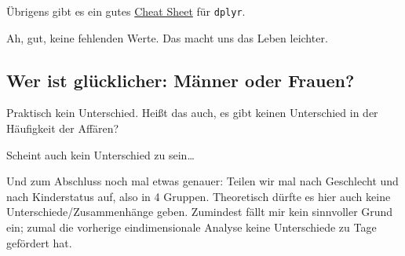 \documentclass[12pt,ngerman,]{book}
\newenvironment{Shaded}{\begin{snugshade}}{\end{snugshade}}
\newcommand{\KeywordTok}[1]{\textcolor[rgb]{0.13,0.29,0.53}{\textbf{{#1}}}}
\newcommand{\DataTypeTok}[1]{\textcolor[rgb]{0.13,0.29,0.53}{{#1}}}
\newcommand{\StringTok}[1]{\textcolor[rgb]{0.31,0.60,0.02}{{#1}}}
\newcommand{\CommentTok}[1]{\textcolor[rgb]{0.56,0.35,0.01}{\textit{{#1}}}}
\newcommand{\NormalTok}[1]{{#1}}
\renewenvironment{Shaded}{\begin{kframe}}{\end{kframe}}
\begin{document}
Übrigens gibt es ein gutes
\href{https://www.rstudio.com/wp-content/uploads/2015/02/data-wrangling-cheatsheet.pdf}{Cheat
Sheet} für \texttt{dplyr}.

Ah, gut, keine fehlenden Werte. Das macht uns das Leben leichter.

\subsection{Wer ist glücklicher: Männer oder
Frauen?}\label{wer-ist-glucklicher-manner-oder-frauen}

\begin{Shaded}
\end{Shaded}

Praktisch kein Unterschied. Heißt das auch, es gibt keinen Unterschied
in der Häufigkeit der Affären?

\begin{Shaded}
\end{Shaded}

Scheint auch kein Unterschied zu sein\ldots{}

Und zum Abschluss noch mal etwas genauer: Teilen wir mal nach Geschlecht
und nach Kinderstatus auf, also in 4 Gruppen. Theoretisch dürfte es hier
auch keine Unterschiede/Zusammenhänge geben. Zumindest fällt mir kein
sinnvoller Grund ein; zumal die vorherige eindimensionale Analyse keine
Unterschiede zu Tage gefördert hat.
\end{document}
